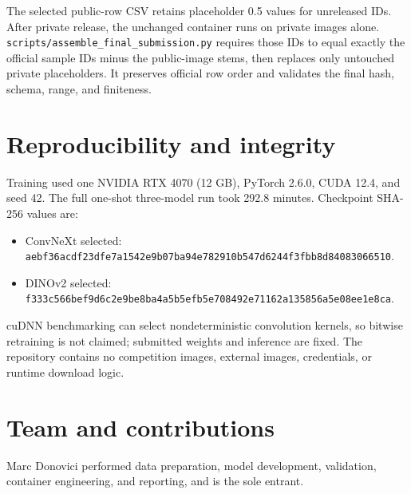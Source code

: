 \documentclass[10pt,a4paper]{article}
\begin{document}
The selected public-row CSV retains placeholder 0.5 values for unreleased IDs. After private release,
the unchanged container runs on private images alone. \texttt{scripts/assemble\_final\_submission.py}
requires those IDs to equal exactly the official sample IDs minus the public-image stems, then replaces
only untouched private placeholders. It preserves official row order and validates the final hash,
schema, range, and finiteness.

\section{Reproducibility and integrity}
Training used one NVIDIA RTX 4070 (12 GB), PyTorch 2.6.0, CUDA 12.4, and seed 42. The full one-shot
three-model run took 292.8 minutes. Checkpoint SHA-256 values are:
\begin{itemize}
\item ConvNeXt selected: \texttt{aebf36acdf23dfe7a1542e9b07ba94e782910b547d6244f3fbb8d84083066510}.
\item DINOv2 selected: \texttt{f333c566bef9d6c2e9be8ba4a5b5efb5e708492e71162a135856a5e08ee1e8ca}.
\end{itemize}
cuDNN benchmarking can select nondeterministic convolution kernels, so bitwise retraining is not
claimed; submitted weights and inference are fixed. The repository contains no competition images,
external images, credentials, or runtime download logic.

\section{Team and contributions}
Marc Donovici performed data preparation, model development, validation, container engineering, and
reporting, and is the sole entrant.



\end{document}
